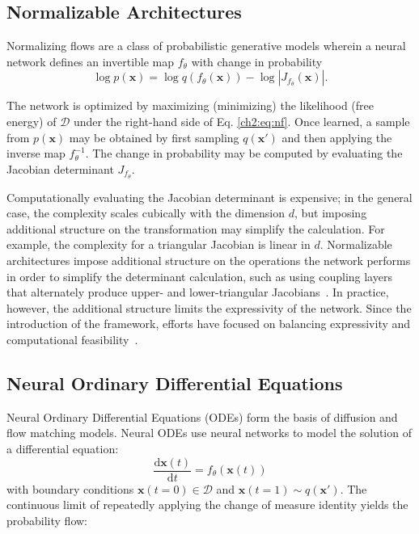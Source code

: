 \subsection{Normalizable Architectures}
\label{ch2:sec:normalizing-flows}

Normalizing flows \cite{kobyzev2020normalizing, papamakarios2021normalizing} are a class of probabilistic generative models wherein a neural network defines an invertible map $f_\theta$ with change in probability
\begin{equation} 
\label{ch2:eq:nf} 
\log p(\mathbf{x}) = \log q(f_\theta(\mathbf{x})) - \log \left|  J_{f_\theta}(\mathbf{x}) \right|.
\end{equation} 

The network is optimized by maximizing (minimizing) the likelihood (free energy) of $\mathcal{D}$ under the right-hand side of Eq. \ref{ch2:eq:nf}. Once learned, a sample from $p(\mathbf{x})$ may be obtained by first sampling $q(\mathbf{x}')$ and then applying the inverse map $f_\theta^{-1}$. The change in probability may be computed by evaluating the Jacobian determinant $J_{f_\theta}$. 

Computationally evaluating the Jacobian determinant is expensive; in the general case, the complexity scales cubically with the dimension $d$, but imposing additional structure on the transformation may simplify the calculation. For example, the complexity for a triangular Jacobian is linear in $d$. Normalizable architectures impose additional structure on the operations the network performs in order to simplify the determinant calculation, such as using coupling layers that alternately produce upper- and lower-triangular Jacobians~\cite{Dinh2017RealNVP}. In practice, however, the additional structure limits the expressivity of the network. Since the introduction of the framework, efforts have focused on balancing expressivity and computational feasibility~\cite{glow,neural-splines,masked-autoregressive-flows,StochasticNF}.

\subsection{Neural Ordinary Differential Equations}
\label{ch2:sec:neural-ode}
Neural Ordinary Differential Equations (ODEs) \cite{NeuralODE} form the basis of diffusion and flow matching models. Neural ODEs use neural networks to model the solution of a differential equation:
\begin{equation}
    \label{ch2:eq:cnf}
    \frac{\mathrm{d}\mathbf{x}(t)}{\mathrm{d}t} = f_\theta(\mathbf{x}(t))
\end{equation}
with boundary conditions $\mathbf{x}(t=0) \in \mathcal{D}$ and $\mathbf{x}(t=1) \sim q(\mathbf{x}')$. The continuous limit of repeatedly applying the change of measure identity yields the probability flow:


